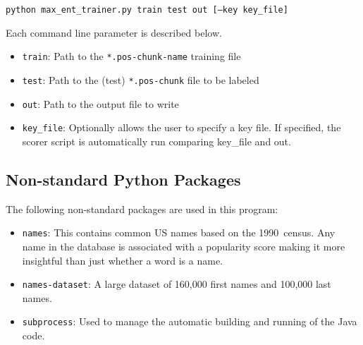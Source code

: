 \documentclass{article}
\begin{document}
  \begin{center}
    \texttt{python max\_ent\_trainer.py train test out [--key key\_file]}
  \end{center}

  \noindent
  Each command line parameter is described below.

  \begin{itemize}
    \item \texttt{train}: Path to the \texttt{*.pos-chunk-name} training file
    \item \texttt{test}: Path to the (test) \texttt{*.pos-chunk} file to be labeled
    \item \texttt{out}: Path to the output file to write
    \item \texttt{key\_file}: Optionally allows the user to specify a key file.  If specified, the scorer script is automatically run comparing \p key\_file and \p out.
  \end{itemize}

  \subsection{Non-standard Python Packages}

  The following non-standard packages are used in this program:

  \begin{itemize}
    \item \texttt{names}: This contains common US names based on the 1990~census. Any name in the database is associated with a popularity score making it more insightful than just whether a word is a name.
    \item \texttt{names-dataset}: A large dataset of 160,000 first names and 100,000 last names.
    \item \texttt{subprocess}: Used to manage the automatic building and running of the Java code.
  \end{itemize}
\end{document}
